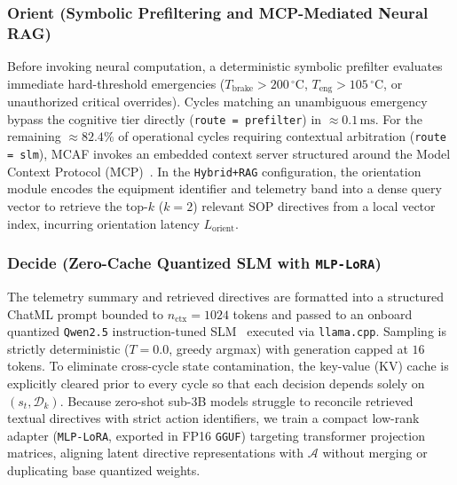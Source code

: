 \documentclass{ieeeaccess}
\begin{document}
\subsubsection{Orient (Symbolic Prefiltering and MCP-Mediated Neural RAG)}
Before invoking neural computation, a deterministic symbolic prefilter evaluates immediate hard-threshold emergencies ($T_{\mathrm{brake}} > 200\,^\circ\text{C}$, $T_{\mathrm{eng}} > 105\,^\circ\text{C}$, or unauthorized critical overrides). Cycles matching an unambiguous emergency bypass the cognitive tier directly (\texttt{route = prefilter}) in $\approx 0.1\,\text{ms}$. For the remaining $\approx 82.4\%$ of operational cycles requiring contextual arbitration (\texttt{route = slm}), MCAF invokes an embedded context server structured around the Model Context Protocol (MCP)~\cite{mcp2024}. In the \texttt{Hybrid+RAG} configuration, the orientation module encodes the equipment identifier and telemetry band into a dense query vector to retrieve the top-$k$ ($k=2$) relevant SOP directives from a local vector index, incurring orientation latency $L_{\mathrm{orient}}$.

\subsubsection{Decide (Zero-Cache Quantized SLM with \texttt{MLP-LoRA})}
The telemetry summary and retrieved directives are formatted into a structured ChatML prompt bounded to $n_{\mathrm{ctx}} = 1024$ tokens and passed to an onboard quantized \texttt{Qwen2.5} instruction-tuned SLM~\cite{qwen25} executed via \texttt{llama.cpp}. Sampling is strictly deterministic ($T = 0.0$, greedy argmax) with generation capped at $16$ tokens. To eliminate cross-cycle state contamination, the key-value (KV) cache is explicitly cleared prior to every cycle so that each decision depends solely on $(s_t, \mathcal{D}_k)$. Because zero-shot sub-3B models struggle to reconcile retrieved textual directives with strict action identifiers, we train a compact low-rank adapter (\texttt{MLP-LoRA}, exported in FP16 \texttt{GGUF}) targeting transformer projection matrices, aligning latent directive representations with $\mathcal{A}$ without merging or duplicating base quantized weights.
\end{document}
